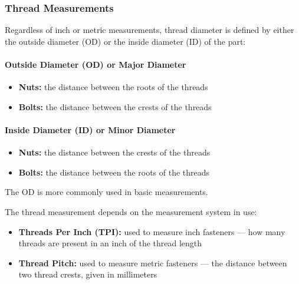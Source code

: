 \documentclass[12pt, a4paper]{article}
\providecommand{\tightlist}{%
	\setlength{\itemsep}{0pt}\setlength{\parskip}{0pt}}
\providecommand{\tightlist}{%
	\setlength{\itemsep}{0pt}\setlength{\parskip}{0pt}}
\let\oldparagraph\paragraph
\renewcommand{\paragraph}[1]{\oldparagraph{#1}\mbox{}}
\begin{document}
		\hypertarget{ik45sl}{%
			\subsubsection{Thread Measurements}\label{ik45sl}}
		
		\hypertarget{in0inq}{}
		Regardless of inch or metric measurements, thread diameter is defined by
		either the outside diameter (OD) or the inside diameter (ID) of the
		part:
		
		\hypertarget{ihbijz}{%
			\paragraph{Outside Diameter (OD) or Major Diameter}\label{ihbijz}}
		
		\begin{itemize}
			\tightlist
			\item
			\textbf{Nuts:} the distance between the roots of the threads
			\item
			\textbf{Bolts:} the distance between the crests of the threads
		\end{itemize}
		
		\hypertarget{i927fk}{%
			\paragraph{Inside Diameter (ID) or Minor Diameter}\label{i927fk}}
		
		\begin{itemize}
			\tightlist
			\item
			\textbf{Nuts:} the distance between the crests of the threads
			\item
			\textbf{Bolts:} the distance between the roots of the threads
		\end{itemize}
		
		\hypertarget{i19mpxz}{}
		The OD is more commonly used in basic measurements.
		
		\hypertarget{iyw6xn}{}
		The thread measurement depends on the measurement system in use:
		
		\begin{itemize}
			\tightlist
			\item
			\textbf{Threads Per Inch (TPI):} used to measure inch fasteners ---
			how many threads are present in an inch of the thread length
			\item
			\textbf{Thread Pitch:} used to measure metric fasteners --- the
			distance between two thread crests, given in millimeters
		\end{itemize}
		
\end{document}
